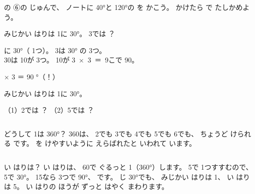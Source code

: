 \begin{jibun}
の ⑥の じゅんで、 ノートに 40°と 120°の を かこう。 かけたら で たしかめよう。
\end{jibun}

\begin{reidai}
みじかい はりは 1に 30°。 3では ？\par
\noindent\begin{minipage}[c]{0.27\linewidth}\centering
{}
\end{minipage}\hfill
\begin{minipage}[c]{0.72\linewidth}
に 30°（ 1つ）。 3は 30° の 3つ。\\
30は 10が 3つ。 10が \mbox{3 × 3 ＝ 9}こで 90。
\end{minipage}\par
{} × 3 ＝ 90 °（！）
\end{reidai}

\begin{jibun}
みじかい はりは 1に 30°。\par
（1）2では ？
\bkshikiran
（2）5では ？
\bkshikiran
{}
\end{jibun}

\begin{column}{どうして 1は 360°？}
360は、 2でも 3でも 4でも 5でも 6でも、 ちょうど けられる です。 を けやすいように えらばれたと いわれて います。
\end{column}

\begin{column}{い はりは？}
い はりは、 60で ぐるっと 1（360°）します。
5で  1つすすむので、 5で 30°。
15なら  3つで 90°、 です。
じ 30°でも、 みじかい はりは 1、 い はりは 5。 い はりの ほうが ずっと はやく まわります。
\end{column}

